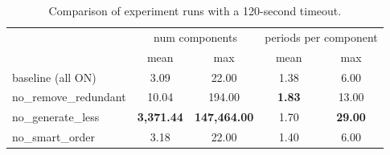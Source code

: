 	
\begin{table}[H]
	\centering
	\begin{tabular}{l c c c c}
		\toprule
	& \multicolumn{2}{c}{num components} & \multicolumn{2}{c}{periods per component} \\
	\cmidrule(lr){2-3} \cmidrule(lr){4-5}
	& mean & max & mean & max \\
	\midrule
	baseline (all ON)         &   3.09    &   22.00    &   1.38   &    6.00   \\
	no\_remove\_redundant     &  10.04    &  194.00    &   \textbf{1.83}   &   13.00   \\
	no\_generate\_less        &\textbf{3{,}371.44}    &\textbf{147{,}464.00}   &   1.70   &   \textbf{29.00}   \\
	no\_smart\_order          &   3.18    &   22.00    &   1.40   &    6.00   \\
  \bottomrule
  \end{tabular}
  \caption{Comparison of experiment runs with a 120-second timeout.}
\end{table}



\newpage